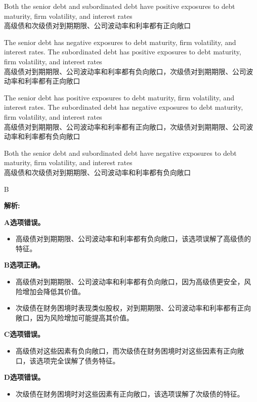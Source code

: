 \documentclass{article}
\newenvironment{explanation}
{\textbf{解析:}\par}
{\par}
\begin{document}
\begin{choices}
    \item Both the senior debt and subordinated debt have positive exposures to debt maturity, firm volatility, and interest rates  \\
    高级债和次级债对到期期限、公司波动率和利率都有正向敞口
    \item The senior debt has negative exposures to debt maturity, firm volatility, and interest rates. The subordinated debt has positive exposures to debt maturity, firm volatility, and interest rates\\
    高级债对到期期限、公司波动率和利率都有负向敞口，次级债对到期期限、公司波动率和利率都有正向敞口
    \item The senior debt has positive exposures to debt maturity, firm volatility, and interest rates. The subordinated debt has negative exposures to debt maturity, firm volatility, and interest rates\\
    高级债对到期期限、公司波动率和利率都有正向敞口，次级债对到期期限、公司波动率和利率都有负向敞口
    \item Both the senior debt and subordinated debt have negative exposures to debt maturity, firm volatility, and interest rates\\
    高级债和次级债对到期期限、公司波动率和利率都有负向敞口
\end{choices}

\begin{correctanswer}
    B
\end{correctanswer}

\begin{explanation}
    \textbf{A选项错误。}
    \begin{itemize}
        \item 高级债对到期期限、公司波动率和利率都有负向敞口，该选项误解了高级债的特征。
    \end{itemize}

    \textbf{B选项正确。}
    \begin{itemize}
        \item 高级债对到期期限、公司波动率和利率都有负向敞口，因为高级债更安全，风险增加会降低其价值。
        \item 次级债在财务困境时表现类似股权，对到期期限、公司波动率和利率都有正向敞口，因为风险增加可能提高其价值。
    \end{itemize}

    \textbf{C选项错误。}
    \begin{itemize}
        \item 高级债对这些因素有负向敞口，而次级债在财务困境时对这些因素有正向敞口，该选项完全误解了债务特征。
    \end{itemize}

    \textbf{D选项错误。}
    \begin{itemize}
        \item 次级债在财务困境时对这些因素有正向敞口，该选项误解了次级债的特征。
    \end{itemize}
\end{explanation}
\end{document}
